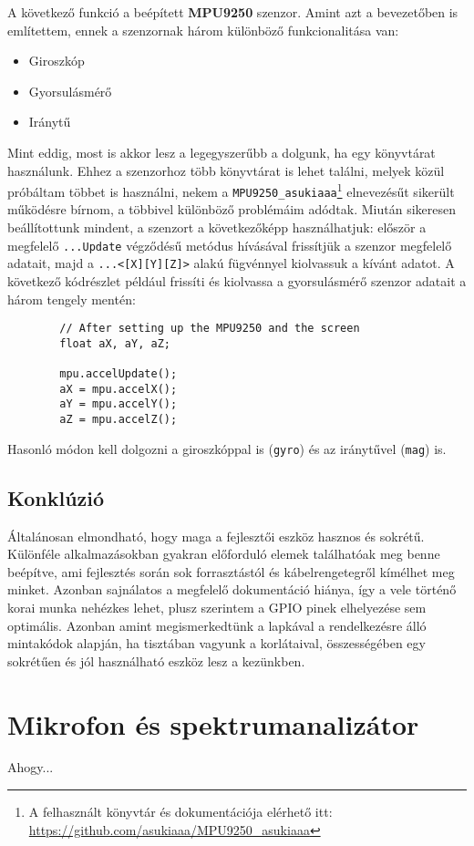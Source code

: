 \documentclass[12pt,a4paper]{article}
\begin{document}
      A következő funkció a beépített \textbf{MPU9250} szenzor. Amint azt a bevezetőben is említettem, ennek a szenzornak három különböző funkcionalitása van:
      \begin{itemize}
        \item Giroszkóp
        \item Gyorsulásmérő
        \item Iránytű
      \end{itemize}
      Mint eddig, most is akkor lesz a legegyszerűbb a dolgunk, ha egy könyvtárat használunk. Ehhez a szenzorhoz több könyvtárat is lehet találni, melyek közül próbáltam többet is használni, nekem a \texttt{MPU9250\_asukiaaa}\footnote{A felhasznált könyvtár és dokumentációja elérhető itt: \url{https://github.com/asukiaaa/MPU9250\_asukiaaa}} elnevezésűt sikerült működésre bírnom, a többivel különböző problémáim adódtak.
      Miután sikeresen beállítottunk mindent, a szenzort a következőképp használhatjuk: először a megfelelő \texttt{...Update} végződésű metódus hívásával frissítjük a szenzor megfelelő adatait, majd a \texttt{...<[X][Y][Z]>} alakú fügvénnyel kiolvassuk a kívánt adatot.
      A következő kódrészlet például frissíti és kiolvassa a gyorsulásmérő szenzor adatait a három tengely mentén:
      \begin{lstlisting}
        // After setting up the MPU9250 and the screen
        float aX, aY, aZ;

        mpu.accelUpdate();
        aX = mpu.accelX();
        aY = mpu.accelY();
        aZ = mpu.accelZ();
      \end{lstlisting}
      Hasonló módon kell dolgozni a giroszkóppal is (\texttt{gyro}) és az iránytűvel (\texttt{mag}) is.


    \subsection{Konklúzió}
      Általánosan elmondható, hogy maga a fejlesztői eszköz hasznos és sokrétű. Különféle alkalmazásokban gyakran előforduló elemek találhatóak meg benne beépítve, ami fejlesztés során sok forrasztástól és kábelrengetegről kímélhet meg minket.
      Azonban sajnálatos a megfelelő dokumentáció hiánya, így a vele történő korai munka nehézkes lehet, plusz szerintem a GPIO pinek elhelyezése sem optimális.
      Azonban amint megismerkedtünk a lapkával a rendelkezésre álló mintakódok alapján, ha tisztában vagyunk a korlátaival, összességében egy sokrétűen és jól használható eszköz lesz a kezünkben.

  \section{Mikrofon és spektrumanalizátor}
    Ahogy...
\end{document}
